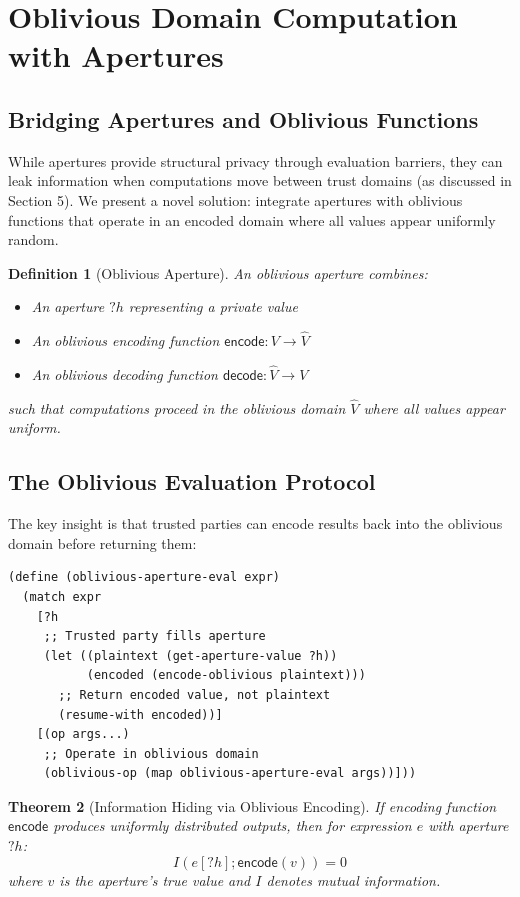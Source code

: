 \documentclass[12pt]{article}
\newtheorem{theorem}{Theorem}
\newtheorem{definition}[theorem]{Definition}
\begin{document}
\section{Oblivious Domain Computation with Apertures}

\subsection{Bridging Apertures and Oblivious Functions}

While apertures provide structural privacy through evaluation barriers, they can leak information when computations move between trust domains (as discussed in Section 5). We present a novel solution: integrate apertures with oblivious functions that operate in an encoded domain where all values appear uniformly random.

\begin{definition}[Oblivious Aperture]
An oblivious aperture combines:
\begin{itemize}
    \item An aperture $?h$ representing a private value
    \item An oblivious encoding function $\mathsf{encode}: V \rightarrow \hat{V}$
    \item An oblivious decoding function $\mathsf{decode}: \hat{V} \rightarrow V$
\end{itemize}
such that computations proceed in the oblivious domain $\hat{V}$ where all values appear uniform.
\end{definition}

\subsection{The Oblivious Evaluation Protocol}

The key insight is that trusted parties can encode results back into the oblivious domain before returning them:

\begin{lstlisting}
(define (oblivious-aperture-eval expr)
  (match expr
    [?h 
     ;; Trusted party fills aperture
     (let ((plaintext (get-aperture-value ?h))
           (encoded (encode-oblivious plaintext)))
       ;; Return encoded value, not plaintext
       (resume-with encoded))]
    [(op args...)
     ;; Operate in oblivious domain
     (oblivious-op (map oblivious-aperture-eval args))]))
\end{lstlisting}

\begin{theorem}[Information Hiding via Oblivious Encoding]
If encoding function $\mathsf{encode}$ produces uniformly distributed outputs, then for expression $e$ with aperture $?h$:
$$I(e[?h]; \mathsf{encode}(v)) = 0$$
where $v$ is the aperture's true value and $I$ denotes mutual information.
\end{theorem}
\end{document}
